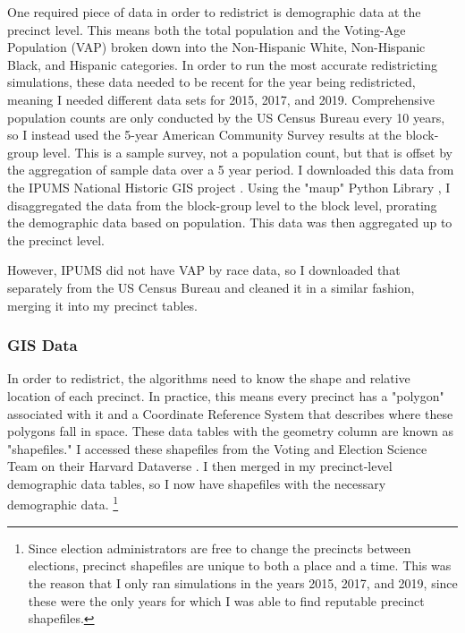 One required piece of data in order to redistrict is demographic data at the precinct level. This means both the total population and the Voting-Age Population (VAP) broken down into the Non-Hispanic White, Non-Hispanic Black, and Hispanic categories. In order to run the most accurate redistricting simulations, these data needed to be recent for the year being redistricted, meaning I needed different data sets for 2015, 2017, and 2019. Comprehensive population counts are only conducted by the US Census Bureau every 10 years, so I instead used the 5-year American Community Survey results at the block-group level. This is a sample survey, not a population count, but that is offset by the aggregation of sample data over a 5 year period. I downloaded this data from the IPUMS National Historic GIS project \parencite{mansonsteven2020}. Using the "maup" Python Library \parencite{hully}, I disaggregated the data from the block-group level to the block level, prorating the demographic data based on population. This data was then aggregated up to the precinct level.

However, IPUMS did not have VAP by race data, so I downloaded that separately from the US Census Bureau \parencite{uscensusbureau} and cleaned it in a similar fashion, merging it into my precinct tables. 

\subsubsection{GIS Data}

In order to redistrict, the algorithms need to know the shape and relative location of each precinct. In practice, this means every precinct has a "polygon" associated with it and a Coordinate Reference System that describes where these polygons fall in space. These data tables with the geometry column are known as "shapefiles." I accessed these shapefiles from the Voting and Election Science Team on their Harvard Dataverse \parencite{votingandelectionscienceteam2019a,votingandelectionscienceteam2019,votingandelectionscienceteam2019b}. I then merged in my precinct-level demographic data tables, so I now have shapefiles with the necessary demographic data. \footnote{Since election administrators are free to change the precincts between elections, precinct shapefiles are unique to both a place and a time. This was the reason that I only ran simulations in the years 2015, 2017, and 2019, since these were the only years for which I was able to find reputable precinct shapefiles.}

